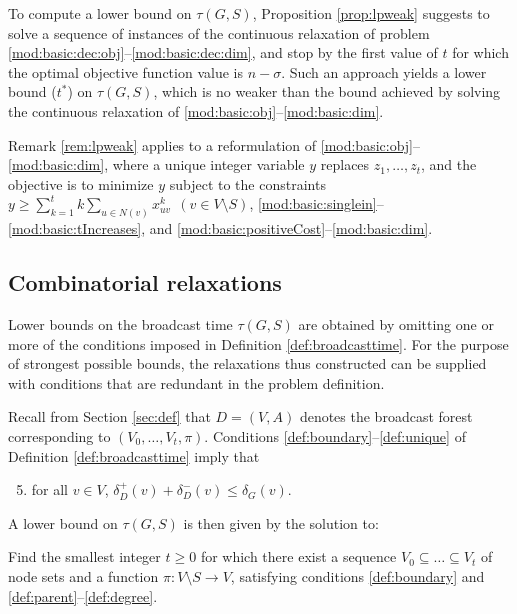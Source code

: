 \begin{remark} \label{rem:lpweak}
To compute a lower bound on $\tau(G,S)$, Proposition \ref{prop:lpweak} suggests to solve a sequence of instances of the continuous relaxation of problem \eqref{mod:basic:dec:obj}--\eqref{mod:basic:dec:dim},
and stop by the first value of $t$ for which the optimal objective function value is $n-\sigma$.
Such an approach yields a lower bound ($t^{\ast}$) on $\tau(G,S)$,
which is no weaker than the bound achieved by solving the continuous relaxation of \eqref{mod:basic:obj}--\eqref{mod:basic:dim}.
\end{remark}

\begin{remark} \label{rem:otheropt}
Remark \ref{rem:lpweak} applies to a reformulation of \eqref{mod:basic:obj}--\eqref{mod:basic:dim}, where a unique integer variable $y$ replaces $z_1,\ldots,z_t$,
and the objective is to minimize $y$ subject to the constraints
$y\geq\sum\limits_{k=1}^tk\sum\limits_{u \in N(v)}x_{uv}^k ~~(v\in V\setminus S)$, \eqref{mod:basic:singlein}--\eqref{mod:basic:tIncreases},
and \eqref{mod:basic:positiveCost}--\eqref{mod:basic:dim}.
\end{remark}

\subsection{Combinatorial relaxations} \label{sec:lbcombrel}

Lower bounds on the broadcast time $\tau(G,S)$ are obtained by omitting one or more of the conditions imposed in Definition \ref{def:broadcasttime}.
For the purpose of strongest possible bounds, the relaxations thus constructed can be supplied with conditions that are redundant in the problem definition.

Recall from Section \ref{sec:def} that $D=(V,A)$ denotes the broadcast forest corresponding to $\left(V_0,\ldots,V_t,\pi\right)$.
Conditions \ref{def:boundary}--\ref{def:unique} of Definition \ref{def:broadcasttime} imply that
\begin{enumerate}
\setcounter{enumi}{4}
  \item for all $v\in V$, $\delta_D^+(v)+\delta_D^-(v)\leq\delta_G(v)$. \label{def:degree}
\end{enumerate}

\noindent
A lower bound on $\tau(G,S)$ is then given by the solution to:
\begin{problem}\label{prob:degree}
Find the smallest integer $t\geq 0$ for which there exist
a sequence $V_0\subseteq\dots\subseteq V_t$ of node sets and a function $\pi:V\setminus S\to V$,
satisfying conditions \ref{def:boundary} and \ref{def:parent}--\ref{def:degree}.
\end{problem}

